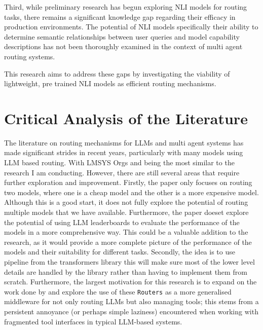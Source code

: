 Third, while preliminary research has begun exploring NLI models for routing tasks, there remains a significant knowledge gap regarding their efficacy in production environments. The potential of NLI models specifically their ability to determine semantic relationships between user queries and model capability descriptions has not been thoroughly examined in the context of multi agent routing systems.

This research aims to address these gaps by investigating the viability of lightweight, pre trained NLI models as efficient routing mechanisms. 

\section{Critical Analysis of the Literature}
\label{sec:lit_rev-critical-analysis-of-the-literature}

The literature on routing mechanisms for LLMs and multi agent systems has made significant strides in recent years, particularly with many models using LLM based routing. With LMSYS Orgs \cite{lmsysroutellm} and \cite{hu2024routerbenchbenchmarkmultillmrouting} being the most similar to the research I am conducting. However, there are still several areas that require further exploration and improvement. Firstly, the paper only focuses on routing two models, where one is a cheap model and the other is a more expensive model. Although this is a good start, it does not fully explore the potential of routing multiple models that we have available. Furthermore, the paper doeset explore the potential of using LLM leaderboards to evaluate the performance of the models in a more comprehensive way. This could be a valuable addition to the research, as it would provide a more complete picture of the performance of the models and their suitability for different tasks.
Secondly, the idea is to use pipeline from the transformers library this will make sure most of the lower level details are handled by the library rather than having to implement them from scratch.
 Furthermore, the largest motivation for this research is to expand on the work done by \cite{lmsysroutellm} and explore the use of these \texttt{Routers} as a more generalised middleware for not only routing LLMs but also managing tools; this stems from a persistent annoyance (or perhaps simple laziness) encountered when working with fragmented tool interfaces in typical LLM-based systems.